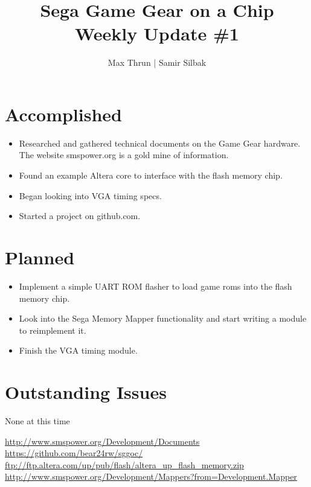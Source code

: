\documentclass[12pt]{article}
\title{Sega Game Gear on a Chip \\ Weekly Update \#1}
\author{ Max Thrun | Samir Silbak }
\begin{document}
\maketitle

\section*{Accomplished}
\begin{itemize}
    \item Researched and gathered technical documents on the Game Gear hardware. The website 
        smspower.org\cite{smspower} is a gold mine of information.
    \item Found an example Altera core to interface with the flash memory chip\cite{altera}.
    \item Began looking into VGA timing specs.
    \item Started a project on github.com\cite{github}.
\end{itemize}

\section*{Planned}
\begin{itemize}
    \item Implement a simple UART ROM flasher to load game roms into the flash memory chip.
    \item Look into the Sega Memory Mapper\cite{mapper} functionality and start writing a module to reimplement it.
    \item Finish the VGA timing  module.
\end{itemize}

\section*{Outstanding Issues}
None at this time

\vspace{.1in}
\begin{thebibliography}{9}
     \url{http://www.smspower.org/Development/Documents}
     \url{https://github.com/bear24rw/sggoc/}
     \url{ftp://ftp.altera.com/up/pub/flash/altera_up_flash_memory.zip}
     \url{http://www.smspower.org/Development/Mappers?from=Development.Mapper}
\end{thebibliography}
\end{document}
